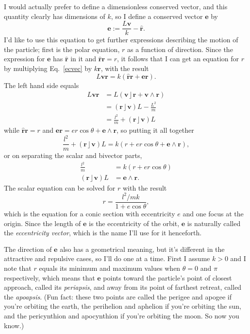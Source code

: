 \documentclass{utarticle}
\DeclareMathOperator{\lin}{\rfloor}
\DeclareMathOperator{\out}{\wedge}
\begin{document}
I would actually prefer to define a dimensionless conserved vector, and this 
quantity clearly has dimensions of $k$, so I define a conserved vector $\bm{e}$
by
\begin{equation} \bm{e} := \frac{L\bm{v}}{k} - \bm{\hat{r}}. \label{ecvec} \end{equation}
I'd like to use this equation to get further expressions describing the motion
of the particle; first is the polar equation, $r$ as a function of direction.  Since 
the expression for $\bm{e}$ has $\bm{\hat{r}}$ in it and $\bm{\hat{r}} \bm{r} = r$, 
it follows that I can get an equation for $r$ by multiplying Eq.~\eqref{ecvec} by 
$k\bm{r}$, with the result
\begin{equation} 
L\bm{v}\bm{r} = k(\bm{\hat{r}}\bm{r} + \bm{e}\bm{r}). \end{equation}
The left hand side equals
\begin{align}
L\bm{v}\bm{r} & = L (\bm{v} \lin \bm{r} + \bm{v} \out \bm{r} ) \nonumber \\
 & = (\bm{r} \lin \bm{v})L - \frac{L^2}{m} \nonumber \\
 & = \frac{l^2}{m} + (\bm{r} \lin \bm{v})L 
\label{Lvr}
\end{align}
while $\bm{\hat{r}}\bm{r} = r$ and $\bm{e}\bm{r} = e r\cos\theta + \bm{e} 
\out \bm{r}$, so putting it all together
\begin{equation}
\frac{l^2}{m} + (\bm{r} \lin \bm{v})L = k(r + e r\cos\theta + \bm{e} 
                                           \out \bm{r}), 
\end{equation}
or on separating the scalar and bivector parts,
\begin{align}
\frac{l^2}{m} & =  k(r + e r\cos\theta) \nonumber \\ 
(\bm{r} \lin \bm{v})L & = \bm{e} \out \bm{r}. 
\end{align}
The scalar equation can be solved for $r$ with the result
\begin{equation} r = \frac{l^2/mk}{1 + e\cos\theta}, \end{equation}
which is the equation for a conic section with eccentricity $e$ and one 
focus at the origin.  Since the length of $\bm{e}$ is the eccentricity 
of the orbit, $\bm{e}$ is naturally called the \emph{eccentricity vector}, 
which is the name I'll use for it henceforth.

The direction of $\bm{e}$ also has a geometrical meaning, but it's
different in the attractive and repulsive cases, so I'll do one at a time.  First
I assume $k > 0$ and I note that $r$ equals its minimum and maximum values 
when $\theta = 0$ and $\pi$ respectively, which means that $\bm{e}$ points 
toward the particle's point of closest approach, called its \emph{periapsis}, 
and away from its point of farthest retreat, called the \emph{apoapsis}.  
(Fun fact: these two points are called the perigee and apogee if you're orbiting
the earth, the perihelion and aphelion if you're orbiting the sun, and the 
pericynthion and apocynthion if you're orbiting the moon.  So now you know.)  
\end{document}
